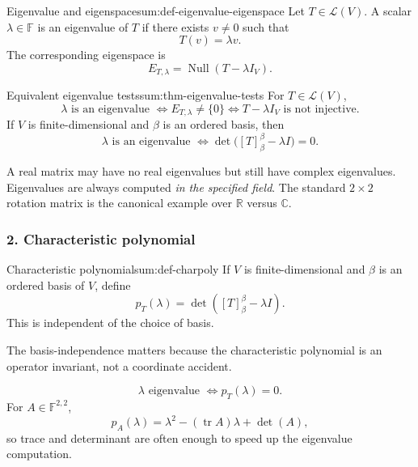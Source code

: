\begin{definition}{Eigenvalue and eigenspace}{sum:def-eigenvalue-eigenspace}
Let \(T\in\mathcal{L}(V)\). A scalar \(\lambda\in\mathbb{F}\) is an eigenvalue of \(T\) if there exists \(v\neq 0\) such that
\[
T(v)=\lambda v.
\]
The corresponding eigenspace is
\[
E_{T,\lambda}=\operatorname{Null}(T-\lambda I_V).
\]
\end{definition}

\begin{theorem}{Equivalent eigenvalue tests}{sum:thm-eigenvalue-tests}
For \(T\in\mathcal{L}(V)\),
\[
\lambda \text{ is an eigenvalue }
\iff
E_{T,\lambda}\neq\{0\}
\iff
T-\lambda I_V \text{ is not injective}.
\]
If \(V\) is finite-dimensional and \(\beta\) is an ordered basis, then
\[
\lambda \text{ is an eigenvalue }
\iff
\det\bigl([T]^\beta_\beta-\lambda I\bigr)=0.
\]
\end{theorem}

\begin{commonmistake}[title={Common Mistake: the field matters}]
A real matrix may have no real eigenvalues but still have complex eigenvalues. Eigenvalues are always computed \emph{in the specified field}. The standard \(2\times 2\) rotation matrix is the canonical example over \(\mathbb{R}\) versus \(\mathbb{C}\).
\end{commonmistake}

\subsubsection*{2. Characteristic polynomial}

\begin{definition}{Characteristic polynomial}{sum:def-charpoly}
If \(V\) is finite-dimensional and \(\beta\) is an ordered basis of \(V\), define
\[
p_T(\lambda)=\det([T]^\beta_\beta-\lambda I).
\]
This is independent of the choice of basis.
\end{definition}

The basis-independence matters because the characteristic polynomial is an operator invariant, not a coordinate accident.

\begin{keyformula}[title={Key Formula: characteristic roots and easy checks}]
\[
\lambda \text{ eigenvalue } \iff p_T(\lambda)=0.
\]
For \(A\in \mathbb{F}^{2,2}\),
\[
p_A(\lambda)=\lambda^2-(\operatorname{tr}A)\lambda+\det(A),
\]
so trace and determinant are often enough to speed up the eigenvalue computation.
\end{keyformula}

